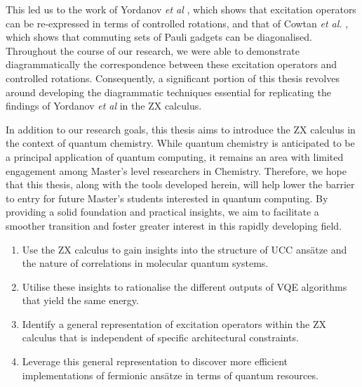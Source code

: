 This led us to the work of Yordanov \textit{et al} \cite{Yordanov2020}, which shows that excitation operators can be re-expressed in terms of controlled rotations, and that of Cowtan \textit{et al.} \cite{Cowtan2020}, which shows that commuting sets of Pauli gadgets can be diagonalised. Throughout the course of our research, we were able to demonstrate diagrammatically the correspondence between these excitation operators and controlled rotations. Consequently, a significant portion of this thesis revolves around developing the diagrammatic techniques essential for replicating the findings of Yordanov \textit{et al} in the ZX calculus.

In addition to our research goals, this thesis aims to introduce the ZX calculus in the context of quantum chemistry. While quantum chemistry is anticipated to be a principal application of quantum computing, it remains an area with limited engagement among Master's level researchers in Chemistry. Therefore, we hope that this thesis, along with the tools developed herein, will help lower the barrier to entry for future Master's students interested in quantum computing. By providing a solid foundation and practical insights, we aim to facilitate a smoother transition and foster greater interest in this rapidly developing field.

\begin{enumerate}[itemsep=-5pt]
\item Use the ZX calculus to gain insights into the structure of UCC ansätze and the nature of correlations in molecular quantum systems.
\item Utilise these insights to rationalise the different outputs of VQE algorithms that yield the same energy.
\item Identify a general representation of excitation operators within the ZX calculus that is independent of specific architectural constraints.
\item Leverage this general representation to discover more efficient implementations of fermionic ansätze in terms of quantum resources.
\end{enumerate}

